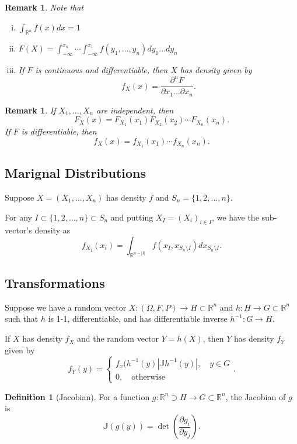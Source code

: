 \documentclass{tufte-handout}
\newcommand*\R{\mathbb{R}}
\newtheorem{rmk}[thm]{Remark}
\theoremstyle{definition}
\newtheorem{defn}[thm]{Definition}
\begin{document}
\begin{rmk}
	Note that
	\begin{enumerate}[(i)]
		\item $\int_{\R^n}^{} f(x)dx = 1 $
		\item $F(X) = \int_{-\infty}^{x_n} \cdots \int_{-\infty}^{x_1}  f(y_1,\ldots,y_n)dy_1\ldots dy_n  $
		\item If $F$ is continuous and differentiable, then $X$ has density given by \[
			f_X(x) = \frac{\partial^n F}{\partial x_1 \ldots \partial x_n}
		.\] 
	\end{enumerate}
\end{rmk}

\begin{rmk}
	If $X_1,\ldots,X_n$ are independent, then \[
		F_X(x) = F_{X_1}(x_1) F_{X_2}(x_2) \cdots F_{X_n}(x_n)
	.\] 
	If $F$ is differentiable, then \[
		f_X(x) = f_{X_1}(x_1) \cdots f_{X_n}(x_n)
	.\] 
\end{rmk}

\subsection{Marignal Distributions}

Suppose $X = \left( X_1,\ldots,X_n \right)$ has density $f$ and $S_n = \{1,2,\ldots,n\}$.

For any $I \subset \{1,2,\ldots,n\} \subset S_n$ and putting $X_I = \left( X_i \right)_{i \in I}$, we have the sub-vector's density as \[
	f_{X_I}(x_i) = \int_{\R^{n - \left| I \right|}}^{} f(x_I, x_{S_n \setminus I})dx_{S_n \setminus I} 
.\] 

\subsection{Transformations}

Suppose we have a random vector $X: \left( \Omega, F, P \right) \to H \subset \R^n$ and $h: H \to G \subset \R^n$ such that $h$ is 1-1, differentiable, and has differentiable inverse $h^{-1}: G \to H$.

If $X$ has density $f_X$ and the random vector $Y = h(X)$, then $Y$ has density $f_Y$ given by \[
	f_Y(y) = \begin{cases}
		f_x(h^{-1}(y) \left| \mathbb{J} h^{-1}(y) \right|, \quad y\in G \\
		0, \quad \text{otherwise}
	\end{cases}
.\]

\begin{defn}[Jacobian]
	For a function $g:\R^n  \supset H \to G \subset \R^n$, the Jacobian of $g$ is \[
		\mathbb{J}(g(y)) = \det \left( \frac{\partial g_i}{\partial y_j}  \right)
	.\] 				
\end{defn}
\end{document}
